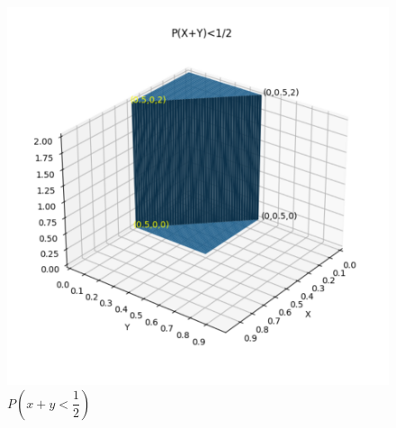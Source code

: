 \documentclass[journal,12pt,twocolumn]{IEEEtran}
\begin{document}
\begin{figure}[h]
    \centering
    \includegraphics[width=\columnwidth]{P(x+y_2)_graph.png}
    \caption{$P\left(x+y<\dfrac{1}{2}\right)$}
    \label{fig:p(x+y<1/2)}
\end{figure}
\end{document}
